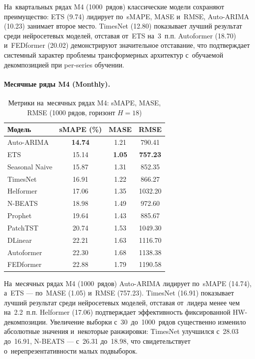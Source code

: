 На~квартальных рядах M4 (1000~рядов) классические модели сохраняют
преимущество: ETS (9.74) лидирует по~sMAPE, MASE и~RMSE, Auto-ARIMA
(10.23) занимает второе место. TimesNet (12.80) показывает лучший результат
среди нейросетевых моделей, отставая от~ETS на~3~п.п.
Autoformer (18.70) и~FEDformer (20.02) демонстрируют значительное
отставание, что подтверждает системный характер проблемы трансформерных
архитектур с~обучаемой декомпозицией при per-series обучении.

\paragraph{Месячные ряды M4 (Monthly).}

\begin{table}[H]
\centering
\caption{Метрики на~месячных рядах M4: sMAPE, MASE, RMSE (1000 рядов, горизонт $H{=}18$)}
\label{tab:m4-monthly-detail}
\small
\begin{tabular}{@{}lccc@{}}
\toprule
Модель & sMAPE (\%) & MASE & RMSE \\
\midrule
Auto-ARIMA     & \textbf{14.74} & 1.21 & 790.41 \\
ETS            & 15.14 & \textbf{1.05} & \textbf{757.23} \\
Seasonal Naive & 15.87 & 1.31 & 852.35 \\
TimesNet       & 16.91 & 1.22 & 866.27 \\
Helformer      & 17.06 & 1.35 & 1032.20 \\
N-BEATS        & 18.98 & 1.49 & 972.60 \\
Prophet        & 19.64 & 1.43 & 885.67 \\
PatchTST       & 20.74 & 1.53 & 1049.30 \\
DLinear        & 22.21 & 1.63 & 1116.70 \\
Autoformer     & 22.30 & 1.68 & 1138.38 \\
FEDformer      & 22.88 & 1.79 & 1190.58 \\
\bottomrule
\end{tabular}
\end{table}

На~месячных рядах M4 (1000~рядов) Auto-ARIMA лидирует по~sMAPE (14.74),
а~ETS --- по~MASE (1.05) и~RMSE (757.23). TimesNet (16.91) показывает
лучший результат среди нейросетевых моделей, отставая от~лидера менее
чем на~2.2~п.п. Helformer (17.06) подтверждает эффективность
фиксированной HW-декомпозиции. Увеличение выборки с~30~до~1000~рядов
существенно изменило абсолютные значения и~некоторые ранжировки:
TimesNet улучшился с~28.03 до~16.91, N-BEATS --- с~26.31 до~18.98,
что свидетельствует о~нерепрезентативности малых подвыборок.

